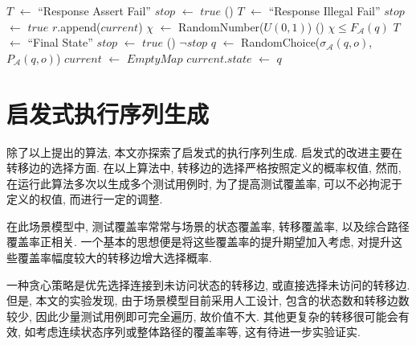 \begin{algorithm}
{{{{{                                 {
                                	$T$ $\gets$ ``Response Assert Fail''\;
                                    $stop$ $\gets$ $true$\;
                                }
                            } \Else() {
                            	 {
                                	$T$ $\gets$ ``Response Illegal Fail''\;
                                    $stop$ $\gets$ $true$\;
                                }
                            }
                        }
                    }
                }
                $r$.append($current$)\;
                 {
                	$\chi$ $\gets$ RandomNumber($U(0,1)$)\;
                    \If() {$\chi \le F_{\mathcal{A}}(q)$} {
                    	$T$ $\gets$ ``Final State''\;
                        $stop$ $\gets$ $true$\;
                    }
                }
            	\If() {$\neg stop$} {
                	$q$ $\gets$ RandomChoice($\sigma_{\mathcal{A}}(q,o)$, $P_{\mathcal{A}}(q,o)$)\;
                    $current$ $\gets$ $EmptyMap$\;
                    $current.state$ $\gets$ $q$\;
                }
            }

            \label{algo:seqgen}
          \end{algorithm}
        
    \section{启发式执行序列生成}
        除了以上提出的算法, 本文亦探索了启发式的执行序列生成. 启发式的改进主要在转移边的选择方面. 在以上算法中, 转移边的选择严格按照定义的概率权值, 然而, 在运行此算法多次以生成多个测试用例时, 为了提高测试覆盖率, 可以不必拘泥于定义的权值, 而进行一定的调整.
        
        在此场景模型中, 测试覆盖率常常与场景的状态覆盖率, 转移覆盖率, 以及综合路径覆盖率正相关. 一个基本的思想便是将这些覆盖率的提升期望加入考虑, 对提升这些覆盖率幅度较大的转移边增大选择概率.
        
        一种贪心策略是优先选择连接到未访问状态的转移边, 或直接选择未访问的转移边. 但是, 本文的实验发现, 由于场景模型目前采用人工设计, 包含的状态数和转移边数较少, 因此少量测试用例即可完全遍历, 故价值不大. 其他更复杂的转移很可能会有效, 如考虑连续状态序列或整体路径的覆盖率等, 这有待进一步实验证实.
        

